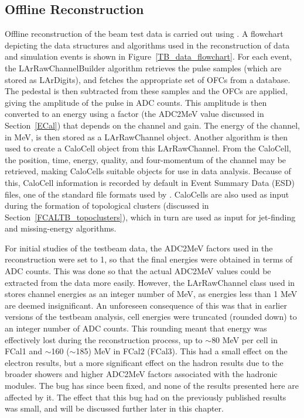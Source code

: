 \subsection{Offline Reconstruction}
\label{TBoverview_offline}
Offline reconstruction of the beam test data is carried out using \athena. A flowchart depicting the data structures and algorithms used in the reconstruction of data and simulation events is shown in Figure~\ref{TB_data_flowchart}. For each event, the LArRawChannelBuilder algorithm retrieves the pulse samples (which are stored as LArDigits), and fetches the appropriate set of OFCs from a database. The pedestal is then subtracted from these samples and the OFCs are applied, giving the amplitude of the pulse in ADC counts. This amplitude is then converted to an energy using a factor (the ADC2MeV value discussed in Section~\ref{ECal}) that depends on the channel and gain. The energy of the channel, in MeV, is then stored as a LArRawChannel object. Another algorithm is then used to create a CaloCell object from this LArRawChannel. From the CaloCell, the position, time, energy, quality, and four-momentum of the channel may be retrieved, making CaloCells suitable objects for use in data analysis. Because of this, CaloCell information is recorded by default in Event Summary Data (ESD) files, one of the standard file formats used by \atlas. CaloCells are also used as input during the formation of topological clusters (discussed in Section~\ref{FCALTB_topoclusters}), which in turn are used as input for jet-finding and missing-energy algorithms.

For initial studies of the testbeam data, the ADC2MeV factors used in the reconstruction were set to 1, so that the final energies were obtained in terms of ADC counts. This was done so that the actual ADC2MeV values could be extracted from the data more easily. However, the LArRawChannel class used in \athena stores channel energies as an integer number of MeV, as energies less than 1 MeV are deemed insignificant. An unforeseen consequence of this was that in earlier versions of the testbeam analysis, cell energies were truncated (rounded down) to an integer number of ADC counts. This rounding meant that energy was effectively lost during the reconstruction process, up to $\sim$80 MeV per cell in FCal1 and $\sim$160 ($\sim$185) MeV in FCal2 (FCal3). This had a small effect on the electron results, but a more significant effect on the hadron results due to the broader showers and higher ADC2MeV factors associated with the hadronic modules. The bug has since been fixed, and none of the results presented here are affected by it. The effect that this bug had on the previously published results \cite{Fcalpaper} was small, and will be discussed further later in this chapter.


